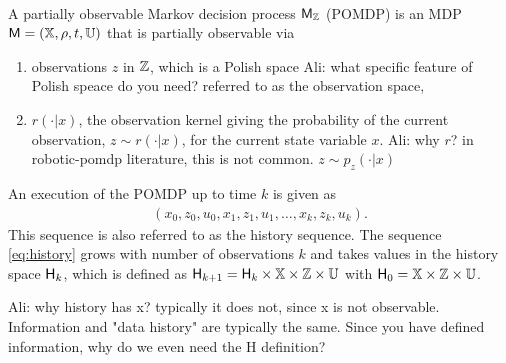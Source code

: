 \documentclass{ifacconf}
\renewcommand{\axx}[1]{{\color{orange} Ali: #1}}
\begin{document}
\begin{definition} \label{def:MDP}\mbox{ }\\
A partially observable Markov decision process $\mathsf{M}_{{\mathbb{Z}}}$ (POMDP) is an MDP $\mathsf{M} = ({\mathbb{X}}, \rho, t, {\mathbb{U}})$  that is partially observable via  
\begin{enumerate}
	\item observations $z$ in ${\mathbb{Z}}$,  which is a Polish space \axx{what specific feature of Polish speace do you need?} referred to as the observation space, %
\item $r(\cdot|x)$,  the observation kernel giving the probability of the current observation,  $z\sim r(\cdot|x)$,  for the current state variable $x$.
\axx{why $r$? in robotic-pomdp literature, this is not common.  $z\sim p_z(\cdot|x)$}
\end{enumerate}


\end{definition} 

An execution of the POMDP  up to time $k$ is given as
\begin{align}\label{eq:history} (x_0,z_0,u_0,x_1,z_1,u_1,\ldots,x_k,z_k,u_k).\end{align}
This sequence is also referred to as the history sequence.
The sequence  \eqref{eq:history} grows with number of observations  $k$ and takes values in the history space ${\mathsf{H}}_k$, which is defined as
  ${\mathsf{H}}_{k+1}={\mathsf{H}}_{k}\times{\mathbb{X}}\times{\mathbb{Z}}\times {\mathbb{U}}$ with ${\mathsf{H}}_0={\mathbb{X}}\times{\mathbb{Z}}\times {\mathbb{U}}$.
  
  \axx{why history has x? typically it does not, since x is not observable. Information and "data history" are typically the same. Since you have defined information, why do we even need the H definition?}
  
\end{document}
